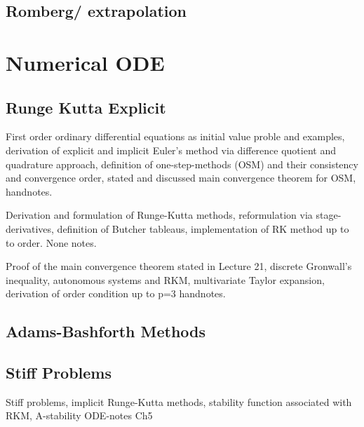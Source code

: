 \documentclass{article}
\theoremstyle{remark}
\begin{document}
\subsection{Romberg/ extrapolation}%
\label{sub:romberg_extrapolation}

\newpage
\section{Numerical ODE}%
\label{sec:numerical_ode}

\subsection{Runge Kutta Explicit }%
\label{sub:runge_kutta_explicit_}

\begin{tcolorbox}
  	First order ordinary differential equations as initial value proble and examples, derivation of explicit and implicit Euler's method via difference quotient and quadrature approach, definition of  one-step-methods (OSM) and their consistency and convergence order, stated and discussed main convergence theorem for OSM,
handnotes.
\end{tcolorbox}
 
\begin{tcolorbox}
  Derivation and formulation of Runge-Kutta methods, reformulation via stage-derivatives, definition of Butcher tableaus, implementation of RK method up to to order.
  None notes.
\end{tcolorbox}

\begin{tcolorbox}
  Proof of the main convergence theorem stated in Lecture 21, discrete Gronwall's inequality, autonomous systems and RKM, multivariate Taylor expansion, derivation of order condition up to p=3	
  handnotes.
\end{tcolorbox}

\subsection{Adams-Bashforth Methods}%
\label{sub:adams_bashforth_methods}

\subsection{Stiff Problems}%
\label{sub:stiff_problems}
\begin{tcolorbox}
  Stiff problems, implicit Runge-Kutta methods, stability function associated with RKM, A-stability	
  ODE-notes  Ch5
\end{tcolorbox}
\end{document}
